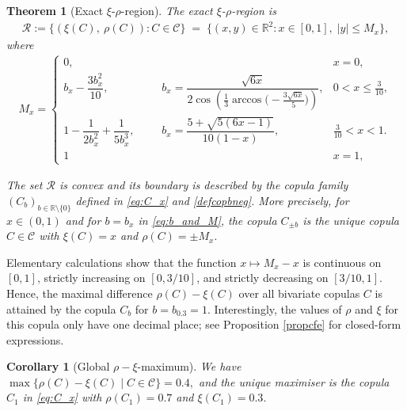 \documentclass{article}
\theoremstyle{plain}
\newtheorem{theorem}{Theorem}
\newtheorem{corollary}{Corollary}
\theoremstyle{definition}
\begin{document}
\begin{theorem}[Exact \(\xi\)-\(\rho\)-region]\label{thexirho}
The exact \(\xi\)-\(\rho\)-region is
\begin{align}\label{eqxirhoregion}
    \mathcal{R}:= \bigl\{(\xi(C),~\rho(C)) : C\in\mathcal{C}\bigr\}
  \;=\;
  \bigl\{(x,y)\in\mathbb{R}^2 : x\in[0,1],\; |y|\le M_x\bigr\},
\end{align}
where
\begin{equation}\label{eq:b_and_M}
\begin{aligned} 
M_x = 
\begin{cases}
0,
   & x=0,\\[1.5ex]
b_x-\dfrac{3b_x^2}{10}, 
 \phantom{1\dfrac{1}{2b_x^2}+\dfrac{1}{5b_x^3}}  b_x = \dfrac{\sqrt{6x}}{2\cos\left(\tfrac13\arccos\bigl(-\tfrac{3\sqrt{6x}}{5}\bigr)\right)},
   & 0<x\le\tfrac{3}{10},\\[4ex]
1-\dfrac{1}{2b_x^2}+\dfrac{1}{5b_x^3}, 
\phantom{b_x\dfrac{3b_x^2}{10}} b_x = \dfrac{5+\sqrt{5(6x-1)}}{10(1-x)}, 
  & \tfrac{3}{10}<x<1.\\
 1 & x = 1,
\end{cases} 
\end{aligned}
\end{equation}

The set \(\mathcal{R}\) is convex and its boundary is described by the copula family $(C_b)_{b\in{\mathbb{R}}\setminus \{0\}}$ defined in \eqref{eq:C_x} and \eqref{defcopbneg}.
More precisely, for \(x\in (0,1)\) and for \(b = b_x\) in \eqref{eq:b_and_M},
the copula \(C_{\pm b}\) is the unique copula \(C\in \mathcal{C}\) with \(\xi(C) = x\) and \(\rho(C) = \pm M_x.\)
\end{theorem} 

Elementary calculations show that the function \(x\mapsto M_x-x\) is continuous on \([0,1]\), strictly increasing on \([0,3/10]\), and strictly decreasing on \([3/10,1].\) Hence,
the maximal difference \(\rho(C)-\xi(C)\) over all bivariate copulas \(C\) is attained by the copula \(C_b\) for \(b = b_{0.3} = 1.\) 
Interestingly, the values of \(\rho\) and \(\xi\) for this copula only have one decimal place; see Proposition \ref{propcfe} for closed-form expressions.

\begin{corollary}[Global $\rho-\xi$-maximum]\label{cor:max-rho-minus-xi}
We have \(\max \{\rho(C)-\xi(C) \mid C\in\mathcal{C} \} =  0.4,\)
and the unique maximiser is the copula $C_{1}$ in \eqref{eq:C_x} with \(\rho(C_1) = 0.7\) and \(\xi(C_1) = 0.3.\) 
\end{corollary}
\end{document}
